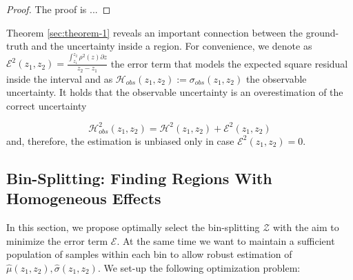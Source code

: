 \documentclass[twoside]{article}
\begin{document}
\begin{proof}
The proof is ...
\end{proof}

\noindent
Theorem \ref{sec:theorem-1} reveals an important connection between
the ground-truth and the uncertainty inside a region. For
convenience, we denote as
\(\mathcal{E}^2(z_1, z_2) = \frac{\int_{z_1}^{z_2}\rho^2(z) \partial
  z}{z_2 - z_1}\) the error term that models the expected square
residual inside the interval and as
\(\mathcal{H}_{obs}(z_1, z_2) := \sigma_{obs}(z_1, z_2)\) the
observable uncertainty. It holds that the observable uncertainty is an
overestimation of the correct uncertainty

\begin{equation}
  \label{eq:uncertainty-bin}
  \mathcal{H}^2_{obs}(z_1, z_2) = \mathcal{H}^2(z_1, z_2) + \mathcal{E}^2(z_1, z_2)
\end{equation}
%
and, therefore, the estimation is unbiased only in case
\(\mathcal{E}^2(z_1, z_2) = 0\).

\subsection{Bin-Splitting: Finding Regions With Homogeneous Effects}
\label{sec:bin-spliting}

In this section, we propose optimally select the bin-splitting
\(\mathcal{Z}\) with the aim to minimize the error term
\(\mathcal{E}\). At the same time we want to maintain a sufficient
population of samples within each bin to allow robust estimation of
\(\hat{\mu}(z_1, z_2), \hat{\sigma}(z_1, z_2)\). We set-up the
following optimization problem:
\end{document}

